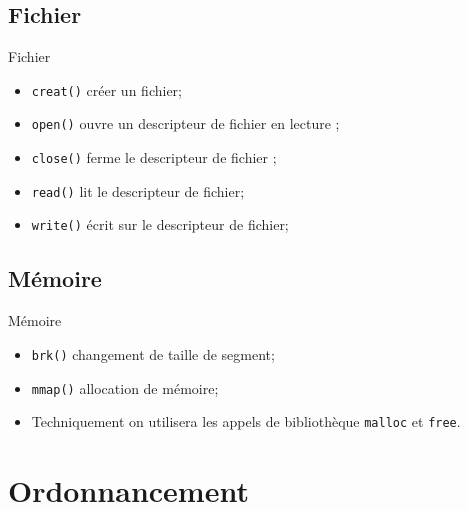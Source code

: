 \begin{frame}{\sectitle}
\def\subsectitle{Fichier}
\subsection{\subsectitle}

\begin{exampleblock}{\subsectitle}
\begin{itemize}
    \item \texttt{creat()} créer un fichier;
    \item \texttt{open()} ouvre un descripteur de fichier en lecture ;
    \item \texttt{close()} ferme le descripteur de fichier ;
    \item \texttt{read()} lit le descripteur de fichier;
    \item \texttt{write()} écrit sur le descripteur de fichier;
\end{itemize}
\end{exampleblock}

\def\subsectitle{Mémoire}
\subsection{\subsectitle}

\begin{exampleblock}{\subsectitle}
\begin{itemize}
    \item \texttt{brk()} changement de taille de segment;
    \item \texttt{mmap()} allocation de mémoire;
    \item Techniquement on utilisera les appels de bibliothèque \texttt{malloc}
        et \texttt{free}.
\end{itemize}
\end{exampleblock}

\end{frame}

\def\sectitle{Ordonnancement}
\section{\sectitle}


